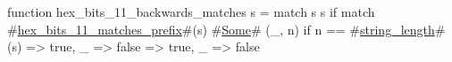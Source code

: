 function hex_bits_11_backwards_matches s = match s {
  s if match #\hyperref[sailRISCVzhexzybitszy11zymatcheszyprefix]{hex\_bits\_11\_matches\_prefix}#(s) {
    #\hyperref[sailRISCVzSome]{Some}# (_, n) if n == #\hyperref[sailRISCVzstringzylength]{string\_length}#(s) => true,
    _ => false
  } => true,
  _ => false
}
